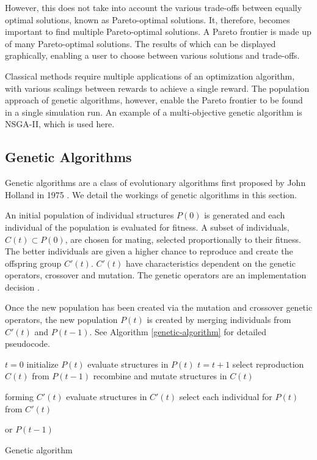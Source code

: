\documentclass[10pt, conference, compsocconf]{IEEEtran}
\begin{document}
However, this does not take into account the various trade-offs between equally optimal solutions, known as Pareto-optimal solutions. It, therefore, becomes important to find multiple Pareto-optimal solutions. A Pareto frontier is made up of many Pareto-optimal solutions. The results of which can be displayed graphically, enabling a user to choose between various solutions and trade-offs.

Classical methods require multiple applications of an optimization algorithm, with various scalings between rewards to achieve a single reward. The population approach of genetic algorithms, however, enable the Pareto frontier to be found in a single simulation run. An example of a multi-objective genetic algorithm is NSGA-II, which is used here.

\subsection{Genetic Algorithms}

Genetic algorithms are a class of evolutionary algorithms first proposed by John Holland in 1975 \cite{Holland1975}. We detail the workings of genetic algorithms in this section.

An initial population of individual structures $P(0)$ is generated and each individual of the population is evaluated for fitness. A subset of individuals, $C(t) \subset P(0)$, are chosen for mating, selected proportionally to their fitness. The better individuals are given a higher chance to reproduce and create the offspring group $C'(t)$. $C'(t)$ have characteristics dependent on the genetic operators, crossover and mutation. The genetic operators are an implementation decision \cite{FogelDavidB2009}. 

Once the new population has been created via the mutation and crossover genetic operators, the new population $P(t)$ is created by merging individuals from $C'(t)$ and $P(t-1)$. See Algorithm \ref{genetic-algorithm} for detailed pseudocode.

\begin{algorithm}[t]
\begin{algorithmic}[1]
\State $t=0$
\State initialize $P(t)$
\State evaluate structures in $P(t)$
\State $t=t+1$
\State select reproduction $C(t)$ from $P(t-1)$
\State recombine and mutate structures in $C(t)$

forming $C'(t)$
\State evaluate structures in $C'(t)$
\State select each individual for $P(t)$ from $C'(t)$ 

or $P(t-1)$
\EndWhile
\caption{Genetic algorithm \cite{FogelDavidB2009}}
\label{genetic-algorithm}
\end{algorithmic}
\end{algorithm}
\end{document}

